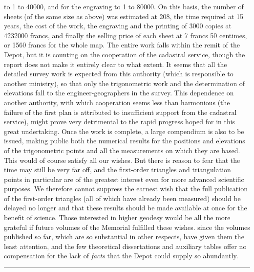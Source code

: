 %
to 1 to 40000, and for the engraving to 1 to 80000. On this basis, the number of sheets (of the same size as above) was estimated at 208, the time required at 15 years, the cost of the work, the engraving and the printing of 3000 copies at 4232000 francs, and finally the selling price of each sheet at 7 francs 50 centimes, or 1560 francs for the whole map. The entire work falls within the remit of the Depot, but it is counting on the cooperation of the cadastral service, though the report does not make it entirely clear to what extent. It seems that all the detailed survey work is expected from this authority (which is responsible to another ministry), so that only the trigonometric work and the determination of elevations fall to the engineer-geographers in the survey. This dependence on another authority, with which cooperation seems less than harmonious (the failure of the first plan is attributed to insufficient support from the cadastral service), might prove very detrimental to the rapid progress hoped for in this great undertaking. Once the work is complete, a large compendium is also to be issued, making public both the numerical results for the positions and elevations of the trigonometric points and all the measurements on which they are based. This would of course satisfy all our wishes. But there is reason to fear that the time may still be very far off, and the first-order triangles and triangulation points in particular are of the greatest interest even for more advanced scientific purposes. We therefore cannot suppress the earnest wish that the full publication of the first-order triangles (all of which have already been measured) should be delayed no longer and that these results should be made available at once for the benefit of science. Those interested in higher geodesy would be all the more grateful if future volumes of the Memorial fulfilled these wishes. since the volumes published so far, which are so substantial in other respects, have given them the least attention, and the few theoretical dissertations and auxiliary tables offer no compensation for the lack of \textit{facts} that the Depot could supply so abundantly.
\begin{center}\rule{.3\textwidth}{.3pt}\end{center}
